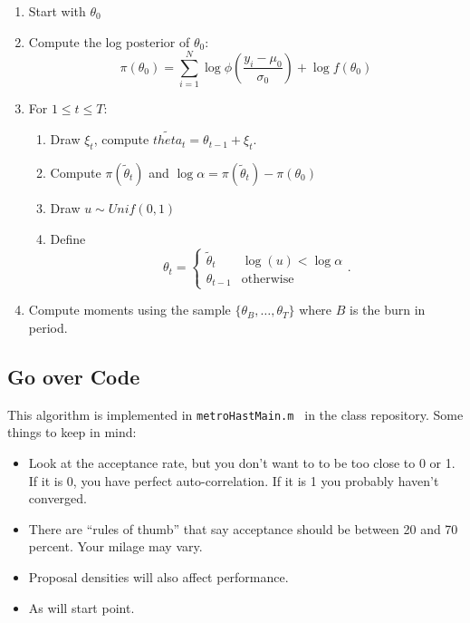 \documentclass[twoside]{article}
\begin{document}
\begin{enumerate}
\item Start with $\theta_0$
\item Compute the log posterior of $\theta_0$:
$$ \pi(\theta_0) = \sum_{i=1}^N \log \phi \left( \frac{y_i - \mu_0}{\sigma_0} \right)  + \log f(\theta_0) $$
\item For $1 \leq t \leq T$: 
\begin{enumerate}
\item Draw $\xi_t$, compute $\tilde{theta}_t = \theta_{t-1} + \xi_t$. 
\item Compute $\pi(\tilde{\theta}_t)$ and $\log \alpha =  \pi(\tilde{\theta}_t) - \pi(\theta_0)$
\item Draw $u \sim Unif(0,1)$
\item Define
$$ \theta_t = 
\begin{cases}
\tilde{\theta}_t & \log(u) < \log \alpha \\
\theta_{t-1} & \mbox{otherwise}
\end{cases}. $$
\end{enumerate}
\item Compute moments using the sample $\{\theta_B, \ldots, \theta_T\}$ where $B$ is the burn in period. 
\end{enumerate}

\subsection{Go over Code}
This algorithm is implemented in {\tt metroHastMain.m } in the class repository.
Some things to keep in mind: 
\begin{itemize}
\item Look at the acceptance rate, but you don't want to to be too close to 0 or 1. If it is 0, you have perfect auto-correlation. If it is 1 you probably haven't converged. 
\item There are ``rules of thumb'' that say acceptance should be between 20 and 70 percent. Your milage may vary. 
\item Proposal densities will also affect performance. 
\item As will start point. 
\end{itemize}
\end{document}
